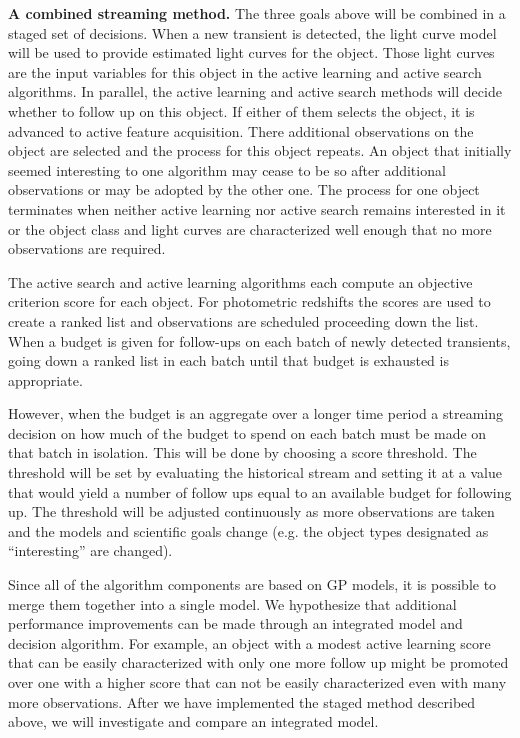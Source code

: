 \documentclass[prd, nofootinbib, floatfix, 12pt,tightenlines]{revtex4}
\begin{document}
{\bf A combined streaming method.} The three goals above will be combined
in a staged set of decisions.  When a new transient is detected, the light
curve model will be used to provide estimated light curves for the object.
Those light curves are the input variables for this object in the active
learning and active search algorithms.  In parallel, the active learning
and active search methods will decide whether to follow up on this object.
If either of them selects the object, it is advanced to active feature
acquisition.  There additional observations on the object are selected and
the process for this object repeats.  An object that initially seemed
interesting to one algorithm may cease to be so after additional
observations or may be adopted by the other one.  The process for one
object terminates when neither active learning nor active search remains
interested in it or the object class and light curves are characterized
well enough that no more observations are required.

The active search and active learning algorithms each compute an objective
criterion score for each object.  For photometric redshifts the scores are
used to create a ranked list and observations are scheduled proceeding down
the list.  When a budget is given for follow-ups on each batch of newly
detected transients, going down a ranked list in each batch until that
budget is exhausted is appropriate.

However, when the budget is an aggregate over a longer time period a
streaming decision on how much of the budget to spend on each batch must be
made on that batch in isolation.  This will be done by choosing a score
threshold.  The threshold will be set by evaluating the historical stream
and setting it at a value that would yield a number of follow ups equal to
an available budget for following up.  The threshold will be adjusted
continuously as more observations are taken and the models and scientific
goals change (e.g. the object types designated as ``interesting'' are
changed).

Since all of the algorithm components are based on GP models, it is
possible to merge them together into a single model.  We hypothesize that
additional performance improvements can be made through an integrated model
and decision algorithm.  For example, an object with a modest active
learning score that can be easily characterized with only one more follow
up might be promoted over one with a higher score that can not be easily
characterized even with many more observations.  After we have implemented
the staged method described above, we will investigate and compare an
integrated model.
\end{document}

